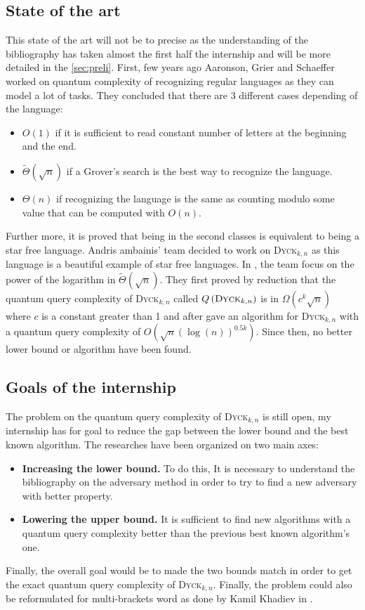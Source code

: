 \documentclass[11pt,a4paper]{article}
\newcommand{\Dyck}[1]{\textsc{Dyck$_{#1}$}}
\theoremstyle{definition}
\theoremstyle{plain}
\theoremstyle{definition}
\begin{document}
\subsection{State of the art}
This state of the art will not be to precise as the understanding of the
bibliography has taken almost the first half the internship and will be
more detailed in the \autoref{sec:preli}. First, few years ago Aaronson,
Grier and Schaeffer \cite[2019]{trichotomy_not_andris} worked on quantum complexity
of recognizing regular languages as they can model a lot of tasks. They
concluded that there are 3 different cases depending of the language:
\begin{itemize}
    \item $O(1)$ if it is sufficient to read constant number of letters at the beginning and the end.
    \item $\tilde{\Theta}(\sqrt{n})$ if a Grover's search is the best way to recognize the language.
    \item $\Theta(n)$ if recognizing the language is the same as counting modulo some value that can
          be computed with $O(n)$.
\end{itemize}
Further more, it is proved that being in the second classes is equivalent to
being a star free language. Andris ambainis' team decided to work on \Dyck{k, n} as this
language is a beautiful example of star free languages. In \cite[2020]{art:2DGrid},
the team focus on the power of the logarithm in $\tilde{\Theta}\left(\sqrt{n}\right)$.
They first proved by reduction that the quantum query complexity of \Dyck{k, n}
called $Q\left(\Dyck{k, n}\right)$ is in $\Omega\left(c^k\sqrt{n}\right)$ where $c$ is
a constant greater than 1 and after gave an algorithm for \Dyck{k, n} with a quantum
query complexity of $O\left(\sqrt{n}(\log(n))^{0.5k}\right)$. Since then, no better
lower bound or algorithm have been found.

\subsection{Goals of the internship}
The problem on the quantum query complexity of \Dyck{k,n} is still open, my internship
has for goal to reduce the gap between the lower bound and the best known algorithm.
The researches have been organized on two main axes:
\begin{itemize}
    \item \textbf{Increasing the lower bound.} To do this, It is necessary to understand the bibliography
          on the adversary method in order to try to find a new adversary with better property.
    \item \textbf{Lowering the upper bound.} It is sufficient to find new algorithms
          with a quantum query complexity better than  the previous best known algorithm's one.
\end{itemize}
Finally, the overall goal would be to made the two bounds match in order to get the exact quantum
query complexity of \Dyck{k,n}. Finally, the problem could also be reformulated for multi-brackets word
as done by Kamil Khadiev in \cite{DBLP:conf/uc/KhadievK21}.
\end{document}
